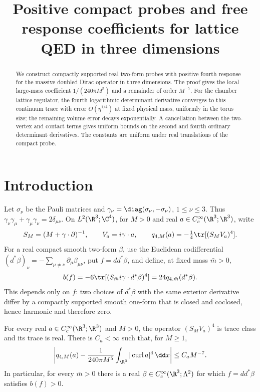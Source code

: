 \documentclass[11pt,letterpaper,reqno]{amsart}
\title[Positive probes and free Dirac response]{Positive compact probes and free response coefficients for lattice QED in three dimensions}
\date{}
\begin{document}
\begin{abstract}
We construct compactly supported real two-form probes with positive
fourth response for the massive doubled Dirac operator in three
dimensions. The proof gives the local large-mass coefficient
$1/(240\pi M^5)$ and a remainder of order $M^{-7}$.
For the chamber lattice regulator, the fourth logarithmic
determinant derivative converges to this continuum trace with
error $O(\eta^{1/4})$ at fixed physical mass, uniformly in the
torus size; the remaining volume error decays exponentially.
A cancellation between the two-vertex and contact terms gives
uniform bounds on the second and fourth ordinary determinant
derivatives. The constants are uniform under real translations
of the compact probe.
\end{abstract}
\maketitle
\tableofcontents

\section{Introduction}\label{sec:introduction}

Let $\sigma_\nu$ be the Pauli matrices and
$\gamma_\nu=\diag(\sigma_\nu,-\sigma_\nu)$, $1\le\nu\le3$.
Thus $\gamma_\nu\gamma_\mu+\gamma_\mu\gamma_\nu=2\delta_{\mu\nu}$.
On $L^2(\R^3;\C^4)$, for $M>0$ and real
$a\in C_c^\infty(\R^3;\R^3)$, write
\[
 S_M=(M+\gamma\cdot\partial)^{-1},\qquad
 V_a=i\gamma\cdot a,\qquad
 q_{4,M}(a)=-\tfrac14\tr[(S_MV_a)^4].
\]
For a real compact smooth two-form $\beta$, use the Euclidean
codifferential
$(d^*\beta)_\nu=-\sum_{\mu\ne\nu}\partial_\mu\beta_{\mu\nu}$,
put $f=dd^*\beta$, and define, at fixed mass $\bar m>0$,
\begin{equation}\label{eq:positive-coefficient}
 b(f)=-6\tr[(S_{\bar m}i\gamma\cdot d^*\beta)^4]
      =24q_{4,\bar m}(d^*\beta).
\end{equation}
This depends only on $f$: two choices of $d^*\beta$ with the same
exterior derivative differ by a compactly supported smooth one-form
that is closed and coclosed, hence harmonic and therefore zero.
\begin{theorem}\label{prop:positive-probe}
For every real $a\in C_c^\infty(\R^3;\R^3)$ and $M>0$,
the operator $(S_MV_a)^4$ is trace class and its trace is real. There
is $C_a<\infty$ such that, for $M\ge1$,
\begin{equation}\label{eq:large-mass-quartic}
 \left|q_{4,M}(a)-\frac1{240\pi M^5}
       \int_{\R^3}|\operatorname{curl}a|^4\,\dd x\right|
 \le C_aM^{-7}.
\end{equation}
In particular, for every $\bar m>0$ there is a real
$\beta\in C_c^\infty(\R^3;\Lambda^2)$ for which $f=dd^*\beta$ satisfies
$b(f)>0$.
\end{theorem}
\end{document}
